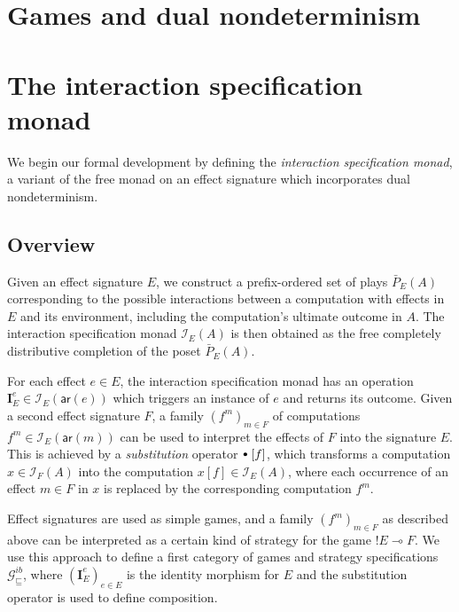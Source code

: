 \documentclass[draft,11pt]{report}
\newcommand{\gcat}{\mathcal{G}_{\sqsubseteq}}
\newcommand{\kw}[1]{\ensuremath{ \mathsf{#1} }}
\newcommand{\sbt}{\,\begin{picture}(-1,1)(-1,-3)\circle*{3}\end{picture}\ }
\begin{document}

\chapter{Games and dual nondeterminism} %


\chapter{The interaction specification monad} \label{sec:intspec} %

We begin our formal development
by defining the \emph{interaction specification monad},
a variant of the free monad on an effect signature which
incorporates dual nondeterminism.

\section{Overview} %

Given an effect signature $E$,
we construct a prefix-ordered set of plays $\bar{P}_E(A)$
corresponding to the possible interactions between
a computation with effects in $E$
and its environment,
including the computation's ultimate outcome in $A$.
The interaction specification monad $\mathcal{I}_E(A)$ is then obtained
as the free completely distributive completion of the poset $\bar{P}_E(A)$.

For each effect $e \in E$,
the interaction specification monad
has an operation
$\mathbf{I}_E^e \in \mathcal{I}_E(\kw{ar}(e))$
which triggers an instance of $e$ and returns its outcome.
Given a second effect signature $F$,
a family $(f^m)_{m \in F}$ of computations
$f^m \in \mathcal{I}_E(\kw{ar}(m))$
can be used to interpret the effects of $F$
into the signature $E$.
This is achieved by a \emph{substitution} operator $\sbt\ [f]$,
which transforms a computation $x \in \mathcal{I}_F(A)$
into the computation $x[f] \in \mathcal{I}_E(A)$,
where each occurrence of an effect $m \in F$ in $x$
is replaced by the corresponding computation $f^m$.

Effect signatures are used as
simple games,
and a family $(f^m)_{m \in F}$ as described above
can be interpreted as
a certain kind of strategy for the game ${!E} \multimap F$.
We use this approach to define
a first category of games and strategy specifications $\gcat^{ib}$,
where $(\mathbf{I}_E^e)_{e \in E}$ is %
the identity morphism for $E$ and
the substitution operator
is used to define composition.
\end{document}
